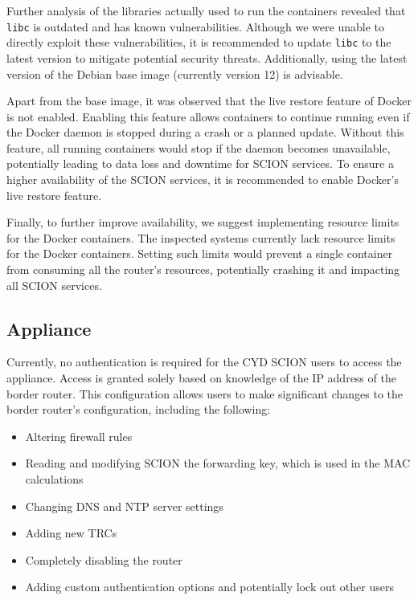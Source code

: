 Further analysis of the libraries actually used to run the containers revealed that \texttt{libc} is outdated and has known vulnerabilities.
Although we were unable to directly exploit these vulnerabilities, it is recommended to update \texttt{libc} to the latest version to mitigate potential security threats.
Additionally, using the latest version of the Debian base image (currently version 12) is advisable.

Apart from the base image, it was observed that the live restore feature of Docker is not enabled.
Enabling this feature allows containers to continue running even if the Docker daemon is stopped during a crash or a planned update.
Without this feature, all running containers would stop if the daemon becomes unavailable, potentially leading to data loss and downtime for SCION services.
To ensure a higher availability of the SCION services, it is recommended to enable Docker's live restore feature.

Finally, to further improve availability, we suggest implementing resource limits for the Docker containers.
The inspected systems currently lack resource limits for the Docker containers.
Setting such limits would prevent a single container from consuming all the router's resources, potentially crashing it and impacting all SCION services.



\subsection{Appliance}
Currently, no authentication is required for the CYD SCION users to access the appliance.
Access is granted solely based on knowledge of the IP address of the border router.
This configuration allows users to make significant changes to the border router's configuration, including the following:

\begin{itemize}
    \item Altering firewall rules
    \item Reading and modifying SCION the forwarding key, which is used in the MAC calculations
    \item Changing DNS and NTP server settings
    \item Adding new TRCs
    \item Completely disabling the router
    \item Adding custom authentication options and potentially lock out other users
\end{itemize}

